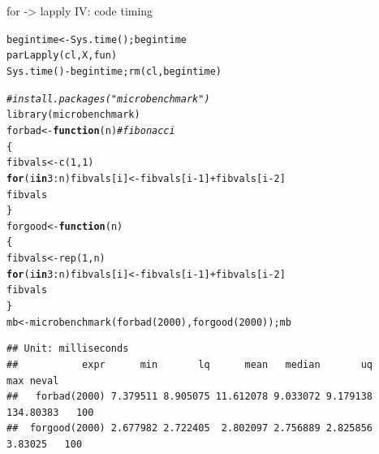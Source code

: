 \documentclass[xcolor=table,       handout,    xcolor=dvipsnames]{beamer}\usepackage[]{graphicx}\usepackage[]{color}
\makeatletter
\newcommand{\hlnum}[1]{\textcolor[rgb]{0,0,0}{#1}}
\newcommand{\hlcom}[1]{\textcolor[rgb]{0,0.392,0}{\textit{#1}}}
\newcommand{\hlopt}[1]{\textcolor[rgb]{0,0,0}{#1}}
\newcommand{\hlstd}[1]{\textcolor[rgb]{0,0,0}{#1}}
\newcommand{\hlkwa}[1]{\textcolor[rgb]{1,0,0}{\textbf{#1}}}
\newcommand{\hlkwb}[1]{\textcolor[rgb]{0,0,0}{#1}}
\newcommand{\hlkwc}[1]{\textcolor[rgb]{1,0,1}{#1}}
\newcommand{\hlkwd}[1]{\textcolor[rgb]{0,0,1}{#1}}
\newenvironment{kframe}{%
 \def\at@end@of@kframe{}%
 \ifinner\ifhmode%
  \def\at@end@of@kframe{\end{minipage}}%
  \begin{minipage}{\columnwidth}%
 \fi\fi%
 \def\FrameCommand##1{\hskip\@totalleftmargin \hskip-\fboxsep
 \colorbox{shadecolor}{##1}\hskip-\fboxsep
     \hskip-\linewidth \hskip-\@totalleftmargin \hskip\columnwidth}%
 \MakeFramed {\advance\hsize-\width
   \@totalleftmargin\z@ \linewidth\hsize
   \@setminipage}}%
 {\par\unskip\endMakeFramed%
 \at@end@of@kframe}
\newenvironment{knitrout}{}{} %
\makeatother
\begin{document}

\begin{frame}[fragile]{for -> lapply IV: code timing}
\vspace{-0.8em}
\scriptsize
\begin{knitrout}
\color{fgcolor}\begin{kframe}
\begin{alltt}
\hlstd{begintime} \hlkwb{<-} \hlkwd{Sys.time}\hlstd{(); begintime}
\hlkwd{parLapply}\hlstd{(cl, X, fun)}
\hlkwd{Sys.time}\hlstd{()} \hlopt{-} \hlstd{begintime ;} \hlkwd{rm}\hlstd{(cl, begintime)}
\end{alltt}
\end{kframe}
\end{knitrout}
\pause \vspace{-1.2em}
\begin{knitrout}\scriptsize
{}\color{fgcolor}\begin{kframe}
\begin{alltt}
\hlcom{#install.packages("microbenchmark")}
\hlkwd{library}\hlstd{(microbenchmark)}
\hlstd{forbad} \hlkwb{<-} \hlkwa{function}\hlstd{(}\hlkwc{n}\hlstd{)}  \hlcom{# fibonacci}
  \hlstd{\{}
  \hlstd{fibvals} \hlkwb{<-} \hlkwd{c}\hlstd{(}\hlnum{1}\hlstd{,}\hlnum{1}\hlstd{)}
  \hlkwa{for} \hlstd{(i} \hlkwa{in} \hlnum{3}\hlopt{:}\hlstd{n) fibvals[i]} \hlkwb{<-} \hlstd{fibvals[i}\hlopt{-}\hlnum{1}\hlstd{]}\hlopt{+}\hlstd{fibvals[i}\hlopt{-}\hlnum{2}\hlstd{]}
  \hlstd{fibvals}
  \hlstd{\}}
\hlstd{forgood} \hlkwb{<-} \hlkwa{function}\hlstd{(}\hlkwc{n}\hlstd{)}
  \hlstd{\{}
  \hlstd{fibvals} \hlkwb{<-} \hlkwd{rep}\hlstd{(}\hlnum{1}\hlstd{,n)}
  \hlkwa{for} \hlstd{(i} \hlkwa{in} \hlnum{3}\hlopt{:}\hlstd{n) fibvals[i]} \hlkwb{<-} \hlstd{fibvals[i}\hlopt{-}\hlnum{1}\hlstd{]}\hlopt{+}\hlstd{fibvals[i}\hlopt{-}\hlnum{2}\hlstd{]}
  \hlstd{fibvals}
  \hlstd{\}}
\hlstd{mb} \hlkwb{<-} \hlkwd{microbenchmark}\hlstd{(}\hlkwd{forbad}\hlstd{(}\hlnum{2000}\hlstd{),} \hlkwd{forgood}\hlstd{(}\hlnum{2000}\hlstd{))  ;  mb}
\end{alltt}
\begin{verbatim}
## Unit: milliseconds
##           expr      min       lq      mean   median       uq       max neval
##   forbad(2000) 7.379511 8.905075 11.612078 9.033072 9.179138 134.80383   100
##  forgood(2000) 2.677982 2.722405  2.802097 2.756889 2.825856   3.83025   100
\end{verbatim}
\end{kframe}
\end{knitrout}
\end{frame}
\end{document}
